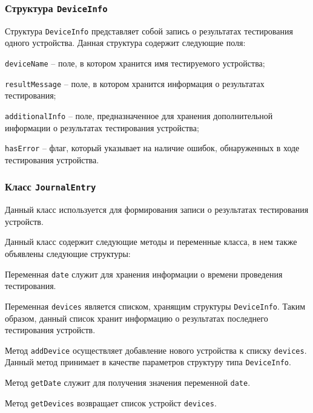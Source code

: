 \subsubsection{Структура \texttt{DeviceInfo}}
Структура \texttt{DeviceInfo} представляет собой запись о результатах тестирования одного устройства.
Данная структура содержит следующие поля:
\begin{enum}
	\item \texttt{deviceName} -- поле, в котором хранится имя тестируемого устройства;
	\item \texttt{resultMessage} -- поле, в котором хранится информация о результатах тестирования;
	\item \texttt{additionalInfo} -- поле, предназначенное для хранения дополнительной информации о
		результатах тестирования устройства;
	\item \texttt{hasError} -- флаг, который указывает на наличие ошибок, обнаруженных в ходе
		тестирования устройства.
\end{enum}

\subsubsection{Класс \texttt{JournalEntry}}
Данный класс используется для формирования записи о результатах тестирования устройств.

Данный класс содержит следующие методы и переменные класса, в нем также объявлены следующие структуры:
\begin{enum}
	\item Переменная \texttt{date} служит для хранения информации о времени проведения тестирования.

	\item Переменная \texttt{devices} является списком, хранящим структуры \texttt{DeviceInfo}. Таким образом,
		данный список хранит информацию о результатах последнего тестирования устройств.

	\item Метод \texttt{addDevice} осуществляет добавление нового устройства к списку \texttt{devices}. Данный метод
		принимает в качестве параметров структуру типа \texttt{DeviceInfo}.

	\item Метод \texttt{getDate} служит для получения значения переменной \texttt{date}.

	\item Метод \texttt{getDevices} возвращает список устройст \texttt{devices}.
\end{enum}

